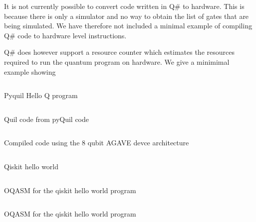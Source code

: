 It is not currently possible to convert code written in Q\# to hardware. This is because there is only a simulator and no way to obtain the list of gates that are being simulated. We have therefore not included a minimal example of compiling Q\# code to hardware level instructions.

Q\# does however support a resource counter which estimates the resources required to run the quantum program on hardware. We give a minimimal example showing 

\noindent \begin{minipage}[t]{0.45\textwidth}
\begin{listing}[H]
   \inputminted{python}{code/asm/pyquil_helloworld.txt} 
    \caption{Pyquil Hello Q program}
\end{listing}
\end{minipage} \hfill 
\begin{minipage}[t]{0.45\textwidth}
\begin{listing}[H]
   \inputminted[lastline=15]{python}{code/asm/pyquil_helloworld_output.txt}
   \caption{Quil code from pyQuil code}
\end{listing}
\begin{listing}[H]
   \inputminted[firstline=17, lastline=37]{python}{code/asm/pyquil_helloworld_output.txt}
   \caption{Compiled code using the 8 qubit AGAVE devce architecture}
\end{listing}
\end{minipage}


\noindent \begin{minipage}[t]{0.55\textwidth}
\begin{listing}[H]
   \inputminted{python}{code/asm/text/progqiskithello.txt}
   \caption{Qiskit hello world}
\end{listing}
\end{minipage} \hfill 
\begin{minipage}[t]{0.3\textwidth}
\begin{listing}[H]
   \inputminted[firstline=2,lastline=18]{python}{code/asm/qiskit_helloworld.output.txt}
   \caption{OQASM for the qiskit hello world program}
\end{listing}
\begin{listing}[H]
   \inputminted[firstline=21]{python}{code/asm/qiskit_helloworld.output.txt}
   \caption{OQASM for the qiskit hello world program}
\end{listing}
\end{minipage}


